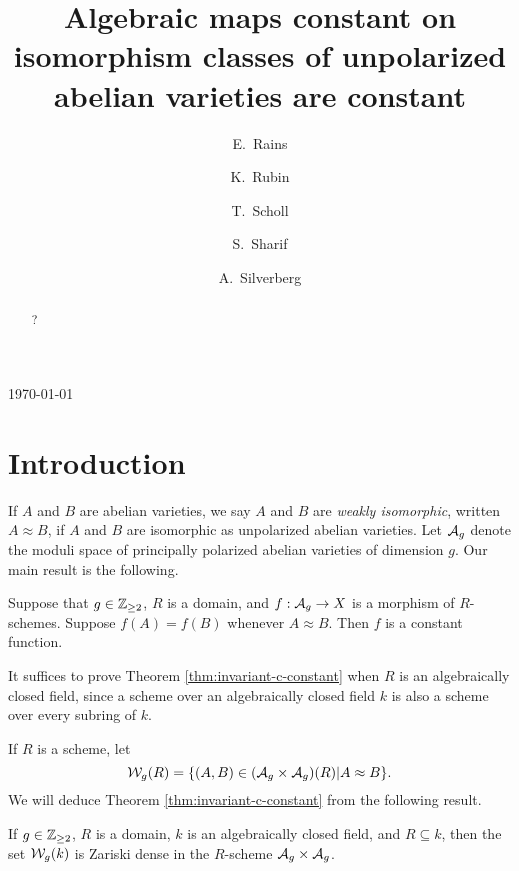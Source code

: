 \documentclass{amsart}
\title[Algebraic maps constant on unpolarized isomorphism classes]{Algebraic maps constant on isomorphism classes of unpolarized abelian varieties are constant}
\author[E.\ Rains]{E.\ Rains}
\author[K.\ Rubin]{K.\ Rubin}
\author[T.\ Scholl]{T.\ Scholl}
\author[S.\ Sharif]{S.\ Sharif}
\author[A.\ Silverberg]{A.\ Silverberg}
\begin{document}
\begin{abstract}
?
\end{abstract}


\today
\maketitle



\section{Introduction}
\label{sec:introduction}

If $A$ and $B$ are abelian varieties, we say $A$ and $B$ are \emph{weakly isomorphic}, written $A \approx B$, if $A$ and $B$ are isomorphic as unpolarized abelian varieties. Let $\mathcal{A}_g$ denote the moduli space of principally polarized abelian varieties of dimension $g$. Our main result is the following.
\begin{theorem}\label{thm:invariant-c-constant}
  Suppose that $g\in\mathbb{Z}_{\ge 2}$, $R$ is a domain, and $f: \mathcal{A}_g \to X$ is a morphism of $R$-schemes. Suppose $f(A) = f(B)$ whenever $A \approx B$. Then $f$ is a constant function.
\end{theorem}

It suffices to prove Theorem \ref{thm:invariant-c-constant} when $R$ is an algebraically closed field, since a scheme over an algebraically closed field $k$ is also a scheme over every subring of $k$.




If $R$ is a scheme, let
$$
\mathcal{W}_g(R) = \{(A,B) \in (\mathcal{A}_g \times \mathcal{A}_g)(R) | A \approx B\}.
$$
We will deduce Theorem \ref{thm:invariant-c-constant} from the following result.

\begin{theorem}\label{thm:sg-c-dense}
  If $g\in\mathbb{Z}_{\ge 2}$, $R$ is a domain, $k$ is an algebraically closed field, and $R \subseteq k$, then the set $\mathcal{W}_g(k)$ is Zariski dense in the $R$-scheme $\mathcal{A}_g \times \mathcal{A}_g$.
\end{theorem}
\end{document}
